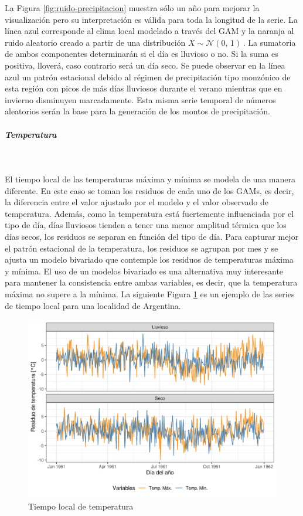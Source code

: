 \documentclass[
  12pt]{article}
\begin{document}
La Figura \ref{fig:ruido-precipitacion} muestra sólo un año para mejorar la visualización pero su interpretación es válida para toda la longitud de la serie. La línea azul corresponde al clima local modelado a través del GAM y la naranja al ruido aleatorio creado a partir de una distribución \(X \sim \mathcal{N}(0,\,1)\,\). La sumatoria de ambos componentes determinarán si el día es lluvioso o no. Si la suma es positiva, lloverá, caso contrario será un día seco. Se puede observar en la línea azul un patrón estacional debido al régimen de precipitación tipo monzónico de esta región con picos de más días lluviosos durante el verano mientras que en invierno disminuyen marcadamente.
Esta misma serie temporal de números aleatorios serán la base para la generación de los montos de precipitación.

\hypertarget{temperatura-1}{%
\subparagraph{Temperatura}\label{temperatura-1}}

~

El tiempo local de las temperaturas máxima y mínima se modela de una manera diferente. En este caso se toman los residuos de cada uno de los GAMs, es decir, la diferencia entre el valor ajustado por el modelo y el valor observado de temperatura. Además, como la temperatura está fuertemente influenciada por el tipo de día, días lluviosos tienden a tener una menor amplitud térmica que los días secos, los residuos se separan en función del tipo de día. Para capturar mejor el patrón estacional de la temperatura, los residuos se agrupan por mes y se ajusta un modelo bivariado que contemple los residuos de temperaturas máxima y mínima. El uso de un modelos bivariado es una alternativa muy interesante para mantener la consistencia entre ambas variables, es decir, que la temperatura máxima no supere a la mínima. La siguiente Figura \ref{fig:ruido-temperatura} es un ejemplo de las series de tiempo local para una localidad de Argentina.

\begin{figure}[H]

{\centering \includegraphics[width=0.75\linewidth]{./docs/figures/ruido_temperatura} 

}

\caption{Tiempo local de temperatura}\label{fig:ruido-temperatura}
\end{figure}
\end{document}
